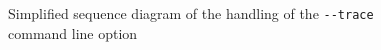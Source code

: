 \documentclass[a4paper]{article}
\begin{document}
	\begin{figure}[ht]
	\centering
	\caption{Simplified sequence diagram of the handling of the \lstinline{--trace} command line option}
	\label{fig:sd_client_trace}
	\end{figure}
	
\end{document}
